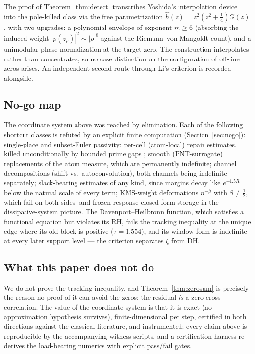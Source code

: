 \documentclass[11pt,reqno]{amsart}
\theoremstyle{plain}
\theoremstyle{definition}
\theoremstyle{remark}
\begin{document}
The proof of Theorem~\ref{thm:detect} transcribes Yoshida's interpolation device
\cite[Lemma~1, Prop.~1(2)]{Yoshida92} into the pole-killed class via the free
parametrization $\hat h(z) = z^2(z^2+\tfrac14)\hat G(z)$, with two upgrades: a polynomial
envelope of exponent $m \ge 6$ (absorbing the induced weight $|p(z_\rho)|^2 \sim |\rho|^8$
against the Riemann--von Mangoldt count), and a unimodular phase normalization at the target
zero. The construction interpolates rather than concentrates, so no case distinction on the
configuration of off-line zeros arises. An independent second route through Li's criterion
\cite{Li97,BombieriLagarias99,Bombieri00} is recorded alongside.

\subsection{No-go map}\label{sec:nogo-intro}

The coordinate system above was reached by elimination. Each of the following shortcut
classes is refuted by an explicit finite computation (Section~\ref{sec:nogo}): single-place
and subset-Euler passivity; per-cell (atom-local) repair estimates, killed unconditionally by
bounded prime gaps \cite{Maynard15}; smooth (PNT-surrogate) replacements of the atom measure,
which are permanently indefinite; channel decompositions (shift vs.\ autoconvolution), both
channels being indefinite separately; slack-bearing estimates of any kind, since margins decay
like $e^{-1.5R}$ below the natural scale of every term; KMS-weight deformations
$n^{-\beta}$ with $\beta \ne \tfrac12$, which fail on both sides; and frozen-response
closed-form storage in the dissipative-system picture. The Davenport--Heilbronn function,
which satisfies a functional equation but violates its RH, fails the tracking inequality at
the unique edge where its old block is positive ($\tau = 1.554$), and its window form is
indefinite at every later support level --- the criterion separates $\zeta$ from DH.

\subsection*{What this paper does not do}
We do not prove the tracking inequality, and Theorem~\ref{thm:zerosum} is precisely the
reason no proof of it can avoid the zeros: the residual \emph{is} a zero cross-correlation.
The value of the coordinate system is that it is exact (no approximation hypothesis
survives), finite-dimensional per step, certified in both directions against the classical
literature, and instrumented: every claim above is reproducible by the accompanying witness
scripts, and a certification harness re-derives the load-bearing numerics with explicit
pass/fail gates.
\end{document}
